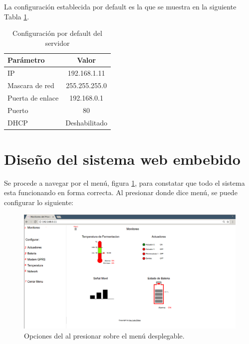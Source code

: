 La configuración establecida por default es la que se muestra en la siguiente Tabla \ref{tab:servercfg}.

\begin{table}[!h]
  \centering
  \begin{tabular}{l c}
    \hline 
    Parámetro    & Valor \\
    \hline \hline
    IP               & 192.168.1.11 \\
    Mascara de red   & 255.255.255.0 \\
    Puerta de enlace & 192.168.0.1 \\
    Puerto           & 80 \\
    DHCP             & Deshabilitado \\
    \hline
  \end{tabular}
  \caption{Configuración por default del servidor}
  \label{tab:servercfg}
\end{table}



\section{Diseño del sistema web embebido}
Se procede a navegar por el menú, figura \ref{fig:web_menus_num}, para constatar que todo el sistema esta funcionando en forma correcta. Al presionar donde dice menú, se puede configurar lo siguiente:

\begin{figure}[h]
  \centering
  \includegraphics[scale=.25]{./Figures/web_menus_num.png}
  \caption{Opciones del al presionar sobre el menú desplegable.}
  \label{fig:web_menus_num}
\end{figure}


